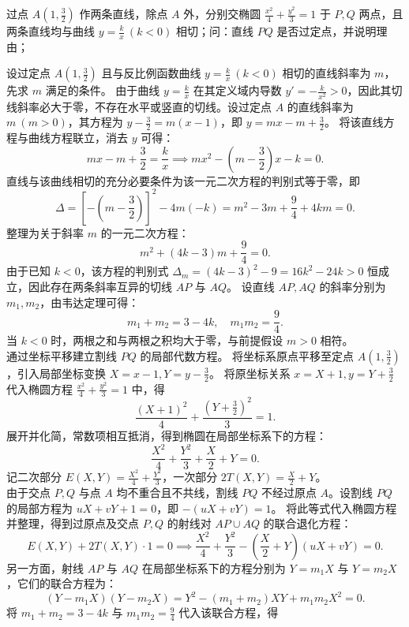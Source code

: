 \begin{example}
过点 \(A\left(1,\frac{3}{2}\right)\) 作两条直线，除点 \(A\) 外，分别交椭圆 \(\frac{x^2}{4} + \frac{y^2}{3} = 1\) 于 \(P,Q\) 两点，且两条直线均与曲线 \(y = \frac{k}{x}\ (k < 0)\) 相切；问：直线 \(PQ\) 是否过定点，并说明理由；
\end{example}
\begin{solution}
设过定点 $A\left(1,\frac{3}{2}\right)$ 且与反比例函数曲线 $y=\frac{k}{x}\ (k<0)$ 相切的直线斜率为 $m$，先求 $m$ 满足的条件。
由于曲线 $y = \frac{k}{x}$ 在其定义域内导数 $y' = -\frac{k}{x^2} > 0$，因此其切线斜率必大于零，不存在水平或竖直的切线。设过定点 $A$ 的直线斜率为 $m\ (m > 0)$，其方程为 $y - \frac{3}{2} = m(x - 1)$，即 $y = mx - m + \frac{3}{2}$。
将该直线方程与曲线方程联立，消去 $y$ 可得：
\[ mx - m + \frac{3}{2} = \frac{k}{x} \implies mx^2 - \left(m - \frac{3}{2}\right)x - k = 0. \]
直线与该曲线相切的充分必要条件为该一元二次方程的判别式等于零，即
\[ \Delta = \left[-\left(m - \frac{3}{2}\right)\right]^2 - 4m(-k) = m^2 - 3m + \frac{9}{4} + 4km = 0. \]
整理为关于斜率 $m$ 的一元二次方程：
\[ m^2 + (4k - 3)m + \frac{9}{4} = 0. \]
由于已知 $k < 0$，该方程的判别式 $\Delta_m = (4k - 3)^2 - 9 = 16k^2 - 24k > 0$ 恒成立，因此存在两条斜率互异的切线 $AP$ 与 $AQ$。
设直线 $AP, AQ$ 的斜率分别为 $m_1, m_2$，由韦达定理可得：
\[ m_1 + m_2 = 3 - 4k, \quad m_1 m_2 = \frac{9}{4}. \]
当 $k < 0$ 时，两根之和与两根之积均大于零，与前提假设 $m > 0$ 相符。\\
通过坐标平移建立割线 $PQ$ 的局部代数方程。
将坐标系原点平移至定点 $A\left(1, \frac{3}{2}\right)$，引入局部坐标变换 $X = x - 1, Y = y - \frac{3}{2}$。
将原坐标关系 $x = X + 1, y = Y + \frac{3}{2}$ 代入椭圆方程 $\frac{x^2}{4} + \frac{y^2}{3} = 1$ 中，得
\[ \frac{(X+1)^2}{4} + \frac{\left(Y+\frac{3}{2}\right)^2}{3} = 1. \]
展开并化简，常数项相互抵消，得到椭圆在局部坐标系下的方程：
\[ \frac{X^2}{4} + \frac{Y^2}{3} + \frac{X}{2} + Y = 0. \]
记二次部分 $E(X,Y) = \frac{X^2}{4} + \frac{Y^2}{3}$，一次部分 $2T(X,Y) = \frac{X}{2} + Y$。\\
由于交点 $P, Q$ 与点 $A$ 均不重合且不共线，割线 $PQ$ 不经过原点 $A$。设割线 $PQ$ 的局部方程为 $uX + vY + 1 = 0$，即 $-(uX + vY) = 1$。
将此等式代入椭圆方程并整理，得到过原点及交点 $P, Q$ 的射线对 $AP \cup AQ$ 的联合退化方程：
\[ E(X,Y) + 2T(X,Y) \cdot 1 = 0 \implies \frac{X^2}{4} + \frac{Y^2}{3} - \left(\frac{X}{2} + Y\right)(uX + vY) = 0. \]
另一方面，射线 $AP$ 与 $AQ$ 在局部坐标系下的方程分别为 $Y = m_1 X$ 与 $Y = m_2 X$，它们的联合方程为：
\[ (Y - m_1 X)(Y - m_2 X) = Y^2 - (m_1 + m_2)XY + m_1 m_2 X^2 = 0. \]
将 $m_1 + m_2 = 3 - 4k$ 与 $m_1 m_2 = \frac{9}{4}$ 代入该联合方程，得

\end{solution}
